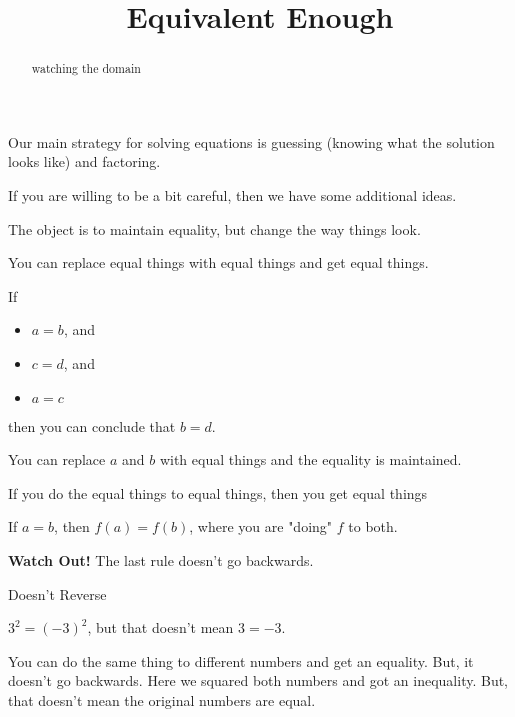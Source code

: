 \documentclass{ximera}
\title{Equivalent Enough}
\begin{document}
\begin{abstract}
watching the domain
\end{abstract}
\maketitle





Our main strategy for solving equations is guessing (knowing what the solution looks like) and factoring.




If you are willing to be a bit careful, then we have some additional ideas.

The object is to maintain equality, but change the way things look.



\begin{observation}


You can replace equal things with equal things and get equal things.


If 
\begin{itemize}
\item $a=b$, and
\item $c=d$, and
\item $a=c$
\end{itemize}
then you can conclude that $b=d$.

You can replace $a$ and $b$ with equal things and the equality is maintained.


\end{observation}





\begin{observation}


If you do the equal things to equal things, then you get equal things


If $a=b$, then $f(a) = f(b)$, where you are "doing" $f$ to both.



\end{observation}




\textbf{Watch Out!} The last rule doesn't go backwards.




\begin{example}  Doesn't Reverse



$3^2 = (-3)^2$, but that doesn't mean $3=-3$.


You can do the same thing to different numbers and get an equality.  But, it doesn't go backwards.  Here we squared both numbers and got an inequality.  But, that doesn't mean the original numbers are equal.


\end{example}
\end{document}
